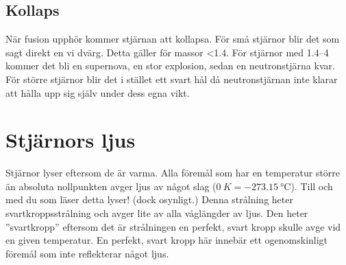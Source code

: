 \subsection{Kollaps}
När fusion upphör kommer stjärnan att kollapsa. För små stjärnor blir det som sagt direkt en vi dvärg. Detta gäller för massor \qty{<1.4}{\Mo}. För stjärnor med \qtyrange{1.4}{4}{\Mo} kommer det bli en supernova, en stor explosion, sedan en neutronstjärna kvar. För större stjärnor blir det i stället ett svart hål då neutronstjärnan inte klarar att hålla upp sig själv under dess egna vikt.


\section{Stjärnors ljus}
Stjärnor lyser eftersom de är varma. Alla föremål som har en temperatur större än absoluta nollpunkten avger ljus av något slag ($\qty{0}{K} = \qty{-273.15}{\degreeCelsius}$). Till och med du som läser detta lyser! (dock osynligt.) Denna strålning heter svartkroppsstrålning och avger lite av alla våglängder av ljus. Den heter ''svartkropp'' eftersom det är strålningen en perfekt, svart kropp skulle avge vid en given temperatur. En perfekt, svart kropp här innebär ett ogenomskinligt föremål som inte reflekterar något ljus.
